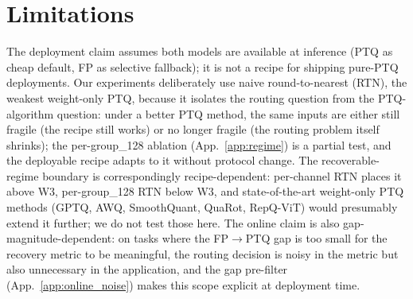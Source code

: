 \documentclass{article}
\newcommand{\fp}{\textsc{FP}\xspace}
\newcommand{\ptq}{\textsc{PTQ}\xspace}
\begin{document}
\section{Limitations}\label{app:limitations}

The deployment claim assumes both models are available at inference (\ptq{} as cheap default, \fp{} as selective fallback); it is not a recipe for shipping pure-\ptq{} deployments.
Our experiments deliberately use naive round-to-nearest (RTN), the weakest weight-only \ptq{}, because it isolates the routing question from the PTQ-algorithm question: under a better \ptq{} method, the same inputs are either still fragile (the recipe still works) or no longer fragile (the routing problem itself shrinks); the per-group\_128 ablation (App.~\ref{app:regime}) is a partial test, and the deployable recipe adapts to it without protocol change.
The recoverable-regime boundary is correspondingly recipe-dependent: per-channel RTN places it above W3, per-group\_128 RTN below W3, and state-of-the-art weight-only \ptq{} methods (GPTQ, AWQ, SmoothQuant, QuaRot, RepQ-ViT) would presumably extend it further; we do not test those here.
The online claim is also gap-magnitude-dependent: on tasks where the \fp$\to$\ptq{} gap is too small for the recovery metric to be meaningful, the routing decision is noisy in the metric but also unnecessary in the application, and the gap pre-filter (App.~\ref{app:online_noise}) makes this scope explicit at deployment time.
\end{document}
